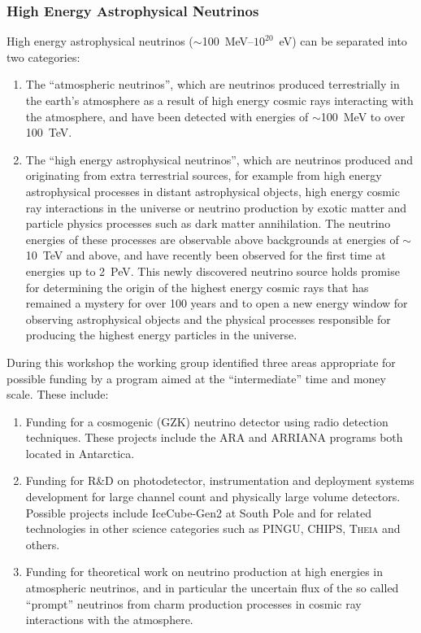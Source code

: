 \subsubsection{High Energy Astrophysical Neutrinos}
\label{sec:Astrophysical_high}

High energy astrophysical neutrinos ($\sim$100~MeV--$10^{20}$~eV) can be
separated into two categories: 
\begin{enumerate}
  \item The ``atmospheric neutrinos'', which are neutrinos produced terrestrially in the earth's
atmosphere as a result of high energy cosmic rays interacting with the
atmosphere, and have been detected with energies of $\sim$100~MeV to over
100~TeV. 
   \item The ``high energy astrophysical neutrinos'', which are
neutrinos produced and originating from extra terrestrial sources, for
example from high energy astrophysical processes in distant
astrophysical objects, high energy cosmic ray interactions in the
universe or neutrino production by exotic matter and particle physics
processes such as dark matter annihilation. The neutrino energies of
these processes are observable above backgrounds at energies of
$\sim$10~TeV and above, and have recently been observed for the first
time at energies up to 2~PeV. This newly discovered neutrino source
holds promise for determining the origin of the highest energy cosmic
rays that has remained a mystery for over 100 years and to open a new
energy window for observing astrophysical objects and the physical
processes responsible for producing the highest energy particles in
the universe.
\end{enumerate}

During this workshop the working group identified three areas
appropriate for possible funding by a program aimed at the
``intermediate'' time and money scale. These include: 
\begin{enumerate}
  \item Funding for a cosmogenic (GZK) neutrino detector using radio detection
techniques. These projects include the ARA and ARRIANA programs both
located in Antarctica.
  \item Funding for R\&D on photodetector,
instrumentation and deployment systems development for large channel
count and physically large volume detectors. Possible projects include
IceCube-Gen2 at South Pole and for related technologies in other
science categories such as PINGU, CHIPS, \textsc{Theia} and others. 
  \item Funding for theoretical work on neutrino production at high energies in
atmospheric neutrinos, and in particular the uncertain flux of the so
called ``prompt'' neutrinos from charm production processes in
cosmic ray interactions with the atmosphere.
\end{enumerate}



